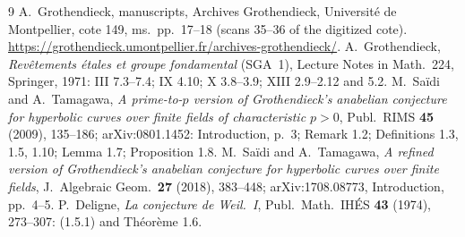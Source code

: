 \documentclass[11pt]{amsart}
\theoremstyle{remark}
\begin{document}
\begin{thebibliography}{9}
 A.~Grothendieck, manuscripts, Archives Grothendieck, Universit\'e de Montpellier, cote 149, ms.~pp.~17--18 (scans 35--36 of the digitized cote). \url{https://grothendieck.umontpellier.fr/archives-grothendieck/}.
 A.~Grothendieck, \emph{Rev\^etements \'etales et groupe fondamental} (SGA~1), Lecture Notes in Math.\ 224, Springer, 1971: III 7.3--7.4; IX 4.10; X 3.8--3.9; XIII 2.9--2.12 and 5.2.
 M.~Sa\"idi and A.~Tamagawa, \emph{A prime-to-$p$ version of Grothendieck's anabelian conjecture for hyperbolic curves over finite fields of characteristic $p>0$}, Publ.\ RIMS \textbf{45} (2009), 135--186; arXiv:0801.1452: Introduction, p.~3; Remark 1.2; Definitions 1.3, 1.5, 1.10; Lemma 1.7; Proposition 1.8.
 M.~Sa\"idi and A.~Tamagawa, \emph{A refined version of Grothendieck's anabelian conjecture for hyperbolic curves over finite fields}, J.\ Algebraic Geom.\ \textbf{27} (2018), 383--448; arXiv:1708.08773, Introduction, pp.~4--5.
 P.~Deligne, \emph{La conjecture de Weil.~I}, Publ.\ Math.\ IH\'ES \textbf{43} (1974), 273--307: (1.5.1) and Th\'eor\`eme 1.6.
\end{thebibliography}
\end{document}
